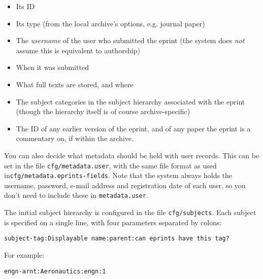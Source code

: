 \begin{itemize}
\item Its ID
\item Its type (from the local archive's options, e.g. journal paper)
\item The \emph{username} of the user who submitted the eprint (the system does \emph{not} assume this is equivalent to authorship)
\item When it was submitted
\item What full texts are stored, and where
\item The subject categories in the subject hierarchy associated with the eprint (though the hierarchy itself is of course archive-specific)
\item The ID of any earlier version of the eprint, and of any paper the eprint is a commentary on, if within the archive.
\end{itemize}

You can also decide what metadata should be held with user records. This can be set in the file {\tt cfg/metadata.user}, with the same file format as used in{\tt cfg/metadata.eprints-fields}. Note that the system always holds the username, password, e-mail address and registration date of each user, so you don't need to include these in {\tt metadata.user}.

The initial subject hierarchy is configured in the file {\tt cfg/subjects}. Each subject is specified on a single line, with four parameters separated by colons:

\begin{verbatim}
subject-tag:Displayable name:parent:can eprints have this tag?
\end{verbatim}

For example:

\begin{verbatim}
engn-arnt:Aeronautics:engn:1
\end{verbatim}


